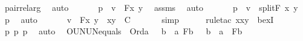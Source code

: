 \begin{isabellebody}
\ pair{\isacharunderscore}{\kern0pt}rel{\isacharunderscore}{\kern0pt}arg\ \isamarkupfalse%
\ auto\ \isanewline
\ \ \isamarkupfalse%
\ \isamarkupfalse%
\ p{}\ {\isacharcolon}{\kern0pt}\ {\isachardoublequoteopen}v\ {\isacharequal}{\kern0pt}\ F{\isacharparenleft}{\kern0pt}x{\isacharcomma}{\kern0pt}\ y{\isacharparenright}{\kern0pt}{\isachardoublequoteclose}\ \isamarkupfalse%
\ assms\ \isamarkupfalse%
\ auto\ \isanewline
\ \ \isamarkupfalse%
\ \isamarkupfalse%
\ p{}\ {\isacharcolon}{\kern0pt}\ {\isachardoublequoteopen}v\ {\isacharequal}{\kern0pt}\ split{\isacharparenleft}{\kern0pt}F{\isacharcomma}{\kern0pt}\ {\isacharless}{\kern0pt}x{\isacharcomma}{\kern0pt}\ y{\isachargreater}{\kern0pt}{\isacharparenright}{\kern0pt}{\isachardoublequoteclose}\ \isamarkupfalse%
\ p{}\ \isamarkupfalse%
\ auto\ \isanewline
\ \ \isamarkupfalse%
\ \isamarkupfalse%
\ {\isachardoublequoteopen}v\ {\isasymin}\ {\isacharbraceleft}{\kern0pt}F{\isacharparenleft}{\kern0pt}x{\isacharcomma}{\kern0pt}\ y{\isacharparenright}{\kern0pt}\ {\isachardot}{\kern0pt}\ {\isasymlangle}x{\isacharcomma}{\kern0pt}y{\isasymrangle}\ {\isasymin}\ C{\isacharbraceright}{\kern0pt}{\isachardoublequoteclose}\ \isanewline
\ \ \ \ \isamarkupfalse%
\ simp\isanewline
\ \ \ \ \isamarkupfalse%
\ {\isacharparenleft}{\kern0pt}rule{\isacharunderscore}{\kern0pt}tac\ x{\isacharequal}{\kern0pt}{\isachardoublequoteopen}{\isacharless}{\kern0pt}x{\isacharcomma}{\kern0pt}y{\isachargreater}{\kern0pt}{\isachardoublequoteclose}\ \ bexI{\isacharparenright}{\kern0pt}\isanewline
\ \ \ \ \isamarkupfalse%
\ p{}\ p{}\ p{}\ \isamarkupfalse%
\ auto\ \isanewline
{}\isamarkupfalse%
%
\endisatagproof
{\isafoldproof}%
%
\isadelimproof
\isanewline
%
\endisadelimproof
\isanewline
\isanewline
{}\isamarkupfalse%
\ OUN{\isacharunderscore}{\kern0pt}UN{\isacharunderscore}{\kern0pt}equals\ {\isacharcolon}{\kern0pt}\ {\isachardoublequoteopen}Ord{\isacharparenleft}{\kern0pt}a{\isacharparenright}{\kern0pt}\ {\isasymLongrightarrow}\ {\isacharparenleft}{\kern0pt}{\isasymUnion}\ b\ {\isacharless}{\kern0pt}\ a{\isachardot}{\kern0pt}\ F{\isacharparenleft}{\kern0pt}b{\isacharparenright}{\kern0pt}{\isacharparenright}{\kern0pt}\ {\isacharequal}{\kern0pt}\ {\isacharparenleft}{\kern0pt}{\isasymUnion}\ b\ {\isasymin}\ a\ {\isachardot}{\kern0pt}\ F{\isacharparenleft}{\kern0pt}b{\isacharparenright}{\kern0pt}{\isacharparenright}{\kern0pt}{\isachardoublequoteclose}\ \isanewline

\end{isabellebody}
